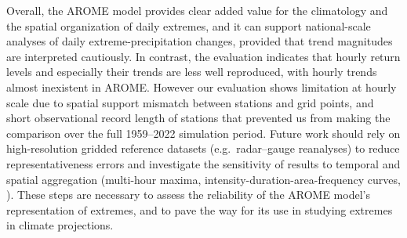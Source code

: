 \documentclass[hess, manuscript]{copernicus}
\begin{document}


Overall, the AROME model provides clear added value for the climatology and the spatial organization of daily extremes, and it can support national-scale analyses of daily extreme-precipitation changes, provided that trend magnitudes are interpreted cautiously. In contrast, the evaluation indicates that hourly return levels and especially their trends are less well reproduced, with hourly trends almost inexistent in AROME. However our evaluation shows limitation at hourly scale due to spatial support mismatch between stations and grid points, and short observational record length of stations that prevented us from making the comparison over the full 1959--2022 simulation period. Future work should rely on high-resolution gridded reference datasets (e.g.\ radar--gauge reanalyses) to reduce representativeness errors and investigate the sensitivity of results to temporal and spatial aggregation (multi-hour maxima, intensity-duration-area-frequency curves, \cite{haruna-etal-2024}). These steps are necessary to assess the reliability of the AROME model's representation of extremes, and to pave the way for its use in studying extremes in climate projections.
\end{document}
